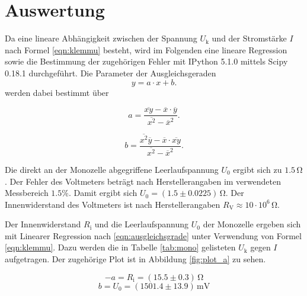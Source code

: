 \section{Auswertung}
\label{sec:Auswertung}
Da eine lineare Abhängigkeit zwischen der Spannung $U_\text{k}$ und der Stromstärke $I$ nach Formel \eqref{eqn:klemmu} besteht,
wird im Folgenden eine lineare Regression sowie die Bestimmung der zugehörigen Fehler mit
IPython 5.1.0 mittels Scipy 0.18.1 durchgeführt.
Die Parameter der Ausgleichsgeraden
\begin{equation}
\label{eqn:ausgleichsgrade}
y=a \cdot x +b .
\end{equation}
werden dabei bestimmt über

\begin{equation*}
\label{eqn:ausgleichsgrade_a}
a= \frac{ \overline{xy}- \overline{x} \cdot \overline{y}}{\overline{x^2}-\overline{x}^2} .
\end{equation*}

\begin{equation*}
\label{eqn:ausgleichsgrade_b}
b= \frac{ \overline{x^2} \overline{y}- \overline{x} \cdot \overline{xy}}{\overline{x^2}-\overline{x}^2} .
\end{equation*}

Die direkt an der Monozelle abgegriffene Leerlaufspannung $U_\text{0}$ ergibt sich zu $1.5 \,\si{\ohm}$.
Der Fehler des Voltmeters beträgt nach Herstellerangaben im verwendeten Messbereich $1.5\%$.
Damit ergibt sich $U_\text{0}=(1.5 \pm 0.0225) \,\si{\ohm}$.
Der Innenwiderstand des Voltmeters ist nach Herstellerangaben $R_\text{V}\approx 10 \cdot 10^6 \,\si{\ohm}$.

Der Innenwiderstand $R_\text{i}$ und die Leerlaufspannung $U_\text{0}$ der Monozelle ergeben sich mit
Linearer Regression nach \eqref{eqn:ausgleichsgrade} unter Verwendung von Formel \eqref{eqn:klemmu}.
Dazu werden die in Tabelle \ref{tab:mono} gelisteten $U_\text{k}$ gegen $I$ aufgetragen. Der zugehörige Plot ist in Abbildung \ref{fig:plot_a} zu sehen.

\begin{equation*}
  -a= R_\text{i}=(15.5\pm0.3)\,\si{\ohm}
\end{equation*}
\begin{equation*}
  b =U_\text{0}=(1501.4\pm13.9)\,\si{\milli\volt}
\end{equation*}


